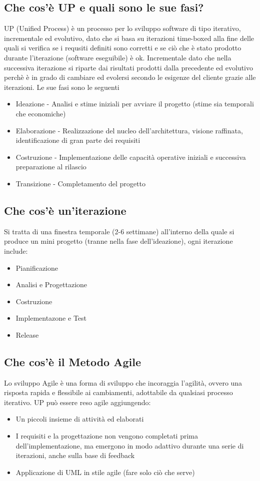 \documentclass[12pt, a4paper, openany]{book}
\begin{document}
\subsection*{Che cos'è UP e quali sono le sue fasi?}
UP (Unified Process) è un processo per lo sviluppo software di tipo iterativo, incrementale
ed evolutivo, dato che si basa su iterazioni time-boxed alla fine delle quali si verifica se i requsiti definiti sono corretti
e se ciò che è stato prodotto durante l'iterazione (software eseguibile) è ok. Incrementale dato che
nella successiva iterazione si riparte dai risultati prodotti dalla precedente ed evolutivo perchè è in grado
di cambiare ed evolersi secondo le esigenze del cliente grazie alle iterazioni. Le sue fasi sono le seguenti
\begin{itemize}
    \item Ideazione - Analisi e stime iniziali per avviare il progetto (stime sia temporali che economiche)
    \item Elaborazione - Realizzazione del nucleo dell'architettura, visione raffinata, identificazione di gran parte
    dei requisiti
    \item Costruzione - Implementazione delle capacità operative iniziali e successiva preparazione al rilascio
    \item Transizione - Completamento del progetto
\end{itemize}

\subsection*{Che cos'è un'iterazione}
Si tratta di una finestra temporale (2-6 settimane) all'interno della quale si produce
un mini progetto (tranne nella fase dell'ideazione), ogni iterazione include:
\begin{itemize}
    \item Pianificazione
    \item Analisi e Progettazione
    \item Costruzione
    \item Implementazone e Test
    \item Release
\end{itemize}
\subsection*{Che cos'è il Metodo Agile}
Lo sviluppo Agile è una forma di sviluppo che incoraggia l'agilità, ovvero una risposta
rapida e flessibile ai cambiamenti, adottabile da qualsiasi processo iterativo. UP
può essere reso agile aggiungendo:
\begin{itemize}
    \item Un piccoli insieme di attività ed elaborati
    \item I requisiti e la progettazione non vengono completati prima dell'implementazione, ma
    emergono in modo adattivo durante una serie di iterazioni, anche sulla base di feedback
    \item Applicazione di UML in stile agile (fare solo ciò che serve)
\end{itemize}
\end{document}
